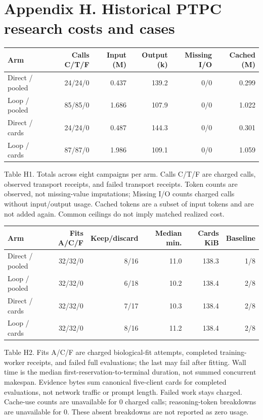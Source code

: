 \section*{Appendix H. Historical PTPC research costs and cases}
\begin{center}\small\setlength{\tabcolsep}{4pt}
\begin{tabular}{lrrrrr}
\toprule
Arm & Calls C/T/F & Input (M) & Output (k) & Missing I/O & Cached (M) \\
\midrule
Direct / pooled & 24/24/0 & 0.437 & 139.2 & 0/0 & 0.299 \\
Loop / pooled & 85/85/0 & 1.686 & 107.9 & 0/0 & 1.022 \\
Direct / cards & 24/24/0 & 0.487 & 144.3 & 0/0 & 0.301 \\
Loop / cards & 87/87/0 & 1.986 & 109.1 & 0/0 & 1.059 \\
\bottomrule\end{tabular}\end{center}
Table H1. Totals across eight campaigns per arm. Calls C/T/F are charged calls, observed transport receipts, and failed transport receipts. Token counts are observed, not missing-value imputations; Missing I/O counts charged calls without input/output usage. Cached tokens are a subset of input tokens and are not added again. Common ceilings do not imply matched realized cost.
\begin{center}\small\setlength{\tabcolsep}{4pt}
\begin{tabular}{lrrrrr}
\toprule
Arm & Fits A/C/F & Keep/discard & Median min. & Cards KiB & Baseline \\
\midrule
Direct / pooled & 32/32/0 & 8/16 & 11.0 & 138.3 & 1/8 \\
Loop / pooled & 32/32/0 & 6/18 & 10.2 & 138.4 & 2/8 \\
Direct / cards & 32/32/0 & 7/17 & 10.3 & 138.4 & 2/8 \\
Loop / cards & 32/32/0 & 8/16 & 11.2 & 138.4 & 2/8 \\
\bottomrule\end{tabular}\end{center}
Table H2. Fits A/C/F are charged biological-fit attempts, completed training-worker receipts, and failed full evaluations; the last may fail after fitting. Wall time is the median first-reservation-to-terminal duration, not summed concurrent makespan. Evidence bytes sum canonical five-client cards for completed evaluations, not network traffic or prompt length. Failed work stays charged.
Cache-use counts are unavailable for 0 charged calls; reasoning-token breakdowns are unavailable for 0. These absent breakdowns are not reported as zero usage.
